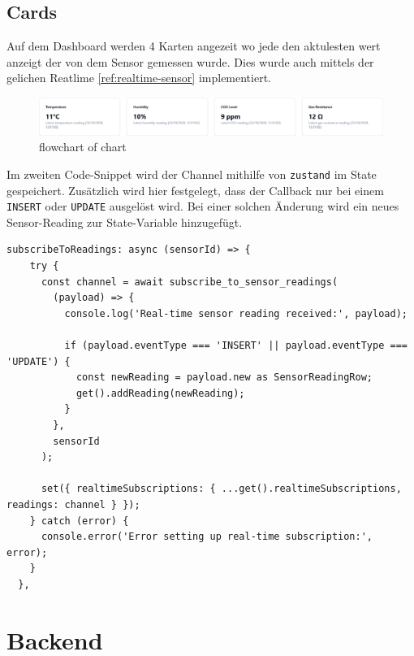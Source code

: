 \begin{inhalt}
\begin{enumerate}[label=\textbf{\arabic*.}]
\newpage


\subsection{Cards}

Auf dem Dashboard werden 4 Karten angezeit wo jede den aktulesten wert anzeigt der von dem Sensor gemessen wurde. Dies wurde auch mittels der gelichen Reatlime \ref{ref:realtime-sensor} implementiert.


\begin{figure}[!htb]
\centering
\includegraphics[width=1\textwidth]{files/Thomas/pics/Website/dashbord/dashboard-card.png}
\caption[Bildbezeichnung für Abbildungsverzeichnis]{flowchart of chart}
\label{fig:gehaeuse_internet_bild}
\end{figure}




\newpage

Im zweiten Code-Snippet wird der Channel mithilfe von \texttt{zustand} im State gespeichert.  
Zusätzlich wird hier festgelegt, dass der Callback nur bei einem \texttt{INSERT} oder \texttt{UPDATE} ausgelöst wird.  
Bei einer solchen Änderung wird ein neues Sensor-Reading zur State-Variable hinzugefügt.

\begin{lstlisting}[language=mytsx]
subscribeToReadings: async (sensorId) => {
    try {
      const channel = await subscribe_to_sensor_readings(
        (payload) => {
          console.log('Real-time sensor reading received:', payload);
          
          if (payload.eventType === 'INSERT' || payload.eventType === 'UPDATE') {
            const newReading = payload.new as SensorReadingRow;
            get().addReading(newReading);
          }
        },
        sensorId
      );
      
      set({ realtimeSubscriptions: { ...get().realtimeSubscriptions, readings: channel } });
    } catch (error) {
      console.error('Error setting up real-time subscription:', error);
    }
  },
\end{lstlisting}






\newpage

\section{Backend}


\end{enumerate}
\end{inhalt}
